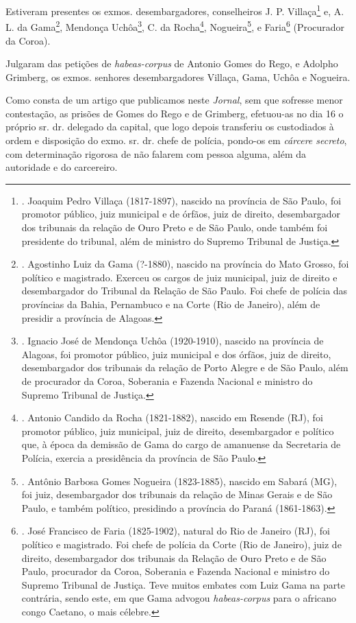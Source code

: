 Estiveram presentes os exmos. desembargadores, conselheiros J. P.
Villaça\footnote{. Joaquim Pedro Villaça (1817-1897), nascido na
  província de São Paulo, foi promotor público, juiz municipal e de
  órfãos, juiz de direito, desembargador dos tribunais da relação de
  Ouro Preto e de São Paulo, onde também foi presidente do tribunal,
  além de ministro do Supremo Tribunal de Justiça.} e, A. L. da
Gama\footnote{. Agostinho Luiz da Gama (?-1880), nascido na província do
  Mato Grosso, foi político e magistrado. Exerceu os cargos de juiz
  municipal, juiz de direito e desembargador do Tribunal da Relação de
  São Paulo. Foi chefe de polícia das províncias da Bahia, Pernambuco e
  na Corte (Rio de Janeiro), além de presidir a província de Alagoas.},
Mendonça Uchôa\footnote{. Ignacio José de Mendonça Uchôa (1920-1910),
  nascido na província de Alagoas, foi promotor público, juiz municipal
  e dos órfãos, juiz de direito, desembargador dos tribunais da relação
  de Porto Alegre e de São Paulo, além de procurador da Coroa, Soberania
  e Fazenda Nacional e ministro do Supremo Tribunal de Justiça.}, C. da
Rocha\footnote{. Antonio Candido da Rocha (1821-1882), nascido em
  Resende (RJ), foi promotor público, juiz municipal, juiz de direito,
  desembargador e político que, à época da demissão de Gama do cargo de
  amanuense da Secretaria de Polícia, exercia a presidência da província
  de São Paulo.}, Nogueira\footnote{. Antônio Barbosa Gomes Nogueira
  (1823-1885), nascido em Sabará (MG), foi juiz, desembargador dos
  tribunais da relação de Minas Gerais e de São Paulo, e também
  político, presidindo a província do Paraná (1861-1863).}, e
Faria\footnote{. José Francisco de Faria (1825-1902), natural do Rio de
  Janeiro (RJ), foi político e magistrado. Foi chefe de polícia da Corte
  (Rio de Janeiro), juiz de direito, desembargador dos tribunais da
  Relação de Ouro Preto e de São Paulo, procurador da Coroa, Soberania e
  Fazenda Nacional e ministro do Supremo Tribunal de Justiça. Teve
  muitos embates com Luiz Gama na parte contrária, sendo este, em que
  Gama advogou \emph{habeas-corpus} para o africano congo Caetano, o
  mais célebre.} (Procurador da Coroa).

Julgaram das petições de \emph{habeas-corpus} de Antonio Gomes do Rego,
e Adolpho Grimberg, os exmos. senhores desembargadores Villaça, Gama,
Uchôa e Nogueira.

Como consta de um artigo que publicamos neste \emph{Jornal}, sem que
sofresse menor contestação, as prisões de Gomes do Rego e de Grimberg,
efetuou-as no dia 16 o próprio sr. dr. delegado da capital, que logo
depois transferiu os custodiados à ordem e disposição do exmo. sr. dr.
chefe de polícia, pondo-os em \emph{cárcere secreto}, com determinação
rigorosa de não falarem com pessoa alguma, além da autoridade e do
carcereiro.

